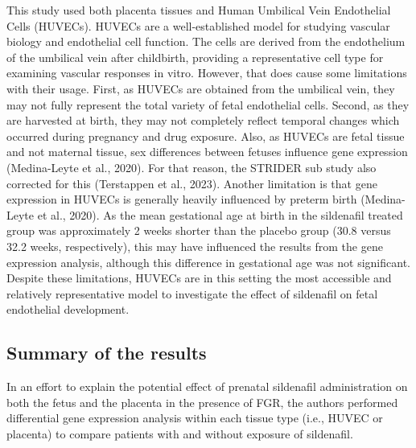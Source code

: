 \documentclass[authordate, reflection]{jote-new-article}
\begin{document}
	This study used both placenta tissues and Human Umbilical Vein Endothelial Cells (HUVECs). HUVECs are a well-established model for studying vascular biology and endothelial cell function. The cells are derived from the endothelium of the umbilical vein after childbirth, providing a representative cell type for examining vascular responses in vitro. However, that does cause some limitations with their usage. First, as HUVECs are obtained from the umbilical vein, they may not fully represent the total variety of fetal endothelial cells. Second, as they are harvested at birth, they may not completely reflect temporal changes which occurred during pregnancy and drug exposure. Also, as HUVECs are fetal tissue and not maternal tissue, sex differences between fetuses influence gene expression (Medina-Leyte et al., 2020).\textsuperscript{ }For that reason, the STRIDER sub study also corrected for this (Terstappen et al., 2023). Another limitation is that gene expression in HUVECs is generally heavily influenced by preterm birth (Medina-Leyte et al., 2020).\textsuperscript{ }As the mean gestational age at birth in the sildenafil treated group was approximately 2 weeks shorter than the placebo group (30.8 versus 32.2 weeks, respectively), this may have influenced the results from the gene expression analysis, although this difference in gestational age was not significant. Despite these limitations, HUVECs are in this setting the most accessible and relatively representative model to investigate the effect of sildenafil on fetal endothelial development.







	\subsection{Summary of the results}



	In an effort to explain the potential effect of prenatal sildenafil administration on both the fetus and the placenta in the presence of FGR, the authors performed differential gene expression analysis within each tissue type (i.e., HUVEC or placenta) to compare patients with and without exposure of sildenafil.
\end{document}

